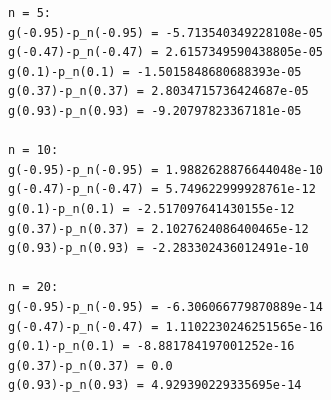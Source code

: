 \documentclass[UTF8,hyperref]{article}
\begin{document}
\begin{lstlisting}
n = 5:
g(-0.95)-p_n(-0.95) = -5.713540349228108e-05
g(-0.47)-p_n(-0.47) = 2.6157349590438805e-05
g(0.1)-p_n(0.1) = -1.5015848680688393e-05
g(0.37)-p_n(0.37) = 2.8034715736424687e-05
g(0.93)-p_n(0.93) = -9.20797823367181e-05

n = 10:
g(-0.95)-p_n(-0.95) = 1.9882628876644048e-10
g(-0.47)-p_n(-0.47) = 5.749622999928761e-12
g(0.1)-p_n(0.1) = -2.517097641430155e-12
g(0.37)-p_n(0.37) = 2.1027624086400465e-12
g(0.93)-p_n(0.93) = -2.283302436012491e-10

n = 20:
g(-0.95)-p_n(-0.95) = -6.306066779870889e-14
g(-0.47)-p_n(-0.47) = 1.1102230246251565e-16
g(0.1)-p_n(0.1) = -8.881784197001252e-16
g(0.37)-p_n(0.37) = 0.0
g(0.93)-p_n(0.93) = 4.929390229335695e-14
\end{lstlisting}
\begin{figure}[htbp]
    \centering
    \quad
    \quad
\end{figure}
\end{document}
